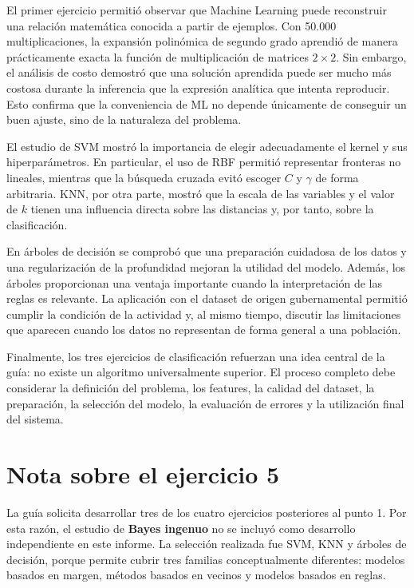 \documentclass[14pt,twoside]{article}
\begin{document}
El primer ejercicio permitió observar que Machine Learning puede reconstruir una relación matemática conocida a partir de ejemplos. Con 50.000 multiplicaciones, la expansión polinómica de segundo grado aprendió de manera prácticamente exacta la función de multiplicación de matrices $2\times2$. Sin embargo, el análisis de costo demostró que una solución aprendida puede ser mucho más costosa durante la inferencia que la expresión analítica que intenta reproducir. Esto confirma que la conveniencia de ML no depende únicamente de conseguir un buen ajuste, sino de la naturaleza del problema.

El estudio de SVM mostró la importancia de elegir adecuadamente el kernel y sus hiperparámetros. En particular, el uso de RBF permitió representar fronteras no lineales, mientras que la búsqueda cruzada evitó escoger $C$ y $\gamma$ de forma arbitraria. KNN, por otra parte, mostró que la escala de las variables y el valor de $k$ tienen una influencia directa sobre las distancias y, por tanto, sobre la clasificación.

En árboles de decisión se comprobó que una preparación cuidadosa de los datos y una regularización de la profundidad mejoran la utilidad del modelo. Además, los árboles proporcionan una ventaja importante cuando la interpretación de las reglas es relevante. La aplicación con el dataset de origen gubernamental permitió cumplir la condición de la actividad y, al mismo tiempo, discutir las limitaciones que aparecen cuando los datos no representan de forma general a una población.

Finalmente, los tres ejercicios de clasificación refuerzan una idea central de la guía: no existe un algoritmo universalmente superior. El proceso completo debe considerar la definición del problema, los features, la calidad del dataset, la preparación, la selección del modelo, la evaluación de errores y la utilización final del sistema. \cite{martinez2026}

\section{Nota sobre el ejercicio 5}

La guía solicita desarrollar tres de los cuatro ejercicios posteriores al punto 1. Por esta razón, el estudio de \textbf{Bayes ingenuo} no se incluyó como desarrollo independiente en este informe. La selección realizada fue SVM, KNN y árboles de decisión, porque permite cubrir tres familias conceptualmente diferentes: modelos basados en margen, métodos basados en vecinos y modelos basados en reglas.
\end{document}
